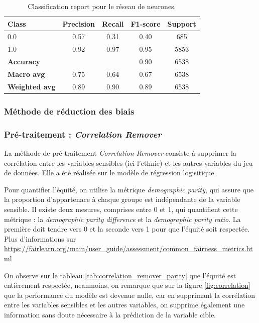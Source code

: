 \documentclass[12pt, letterpaper]{article}
\begin{document}
\begin{table}[h!]
    \centering
    \begin{tabular}{lcccc}
    \hline
    \textbf{Class} & \textbf{Precision} & \textbf{Recall} & \textbf{F1-score} & \textbf{Support} \\
    \hline
    0.0 & 0.57 & 0.31 & 0.40 & 685 \\
    1.0 & 0.92 & 0.97 & 0.95 & 5853 \\
    \hline
    \textbf{Accuracy} & & & 0.90 & 6538 \\
    \textbf{Macro avg} & 0.75 & 0.64 & 0.67 & 6538 \\
    \textbf{Weighted avg} & 0.89 & 0.90 & 0.89 & 6538 \\
    \hline
    \end{tabular}
    \caption{Classification report pour le réseau de neurones.}
    \label{tab:classification_report}
\end{table}

\subsubsection{Méthode de réduction des biais}

\subsubsection*{Pré-traitement : \emph{Correlation Remover}}
La méthode de pré-traitement \emph{Correlation Remover} consiste à supprimer la corrélation entre les 
variables sensibles (ici l'ethnie) et les autres variables du jeu de données. Elle a été réalisée sur le modèle de régression logisitique.

Pour quantifier l'équité, on utilise la métrique \emph{demographic parity}, qui assure que la proportion d'appartenace à chaque groupe est indépendante de la variable sensible.
Il existe deux mesures, comprises entre 0 et 1, qui quantifient cette métrique : la \emph{demographic parity difference} et la \emph{demographic parity ratio}.
La première doit tendre vers 0 et la seconde vers 1 pour que l'équité soit respectée.
Plus d'informations sur \url{https://fairlearn.org/main/user_guide/assessment/common_fairness_metrics.html}

On observe sur le tableau \ref{tab:correlation_remover_parity} que l'équité est entièrement respectée, neanmoins, on remarque que sur la figure \ref{fig:correlation} que la performance du modèle est devenue nulle, car en supprimant 
la corrélation entre les variables sensibles et les autres variables, on supprime également une information sans doute nécessaire à la prédiction de la variable cible.
\end{document}

